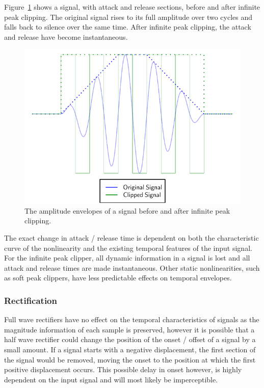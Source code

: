 			Figure~\ref{fig:InfinitePeakClipping} shows a signal, with attack and release sections, before and
			after infinite peak clipping. The original signal rises to its full amplitude over two cycles and
			falls back to silence over the same time. After infinite peak clipping, the attack and release have
			become instantaneous.

			\begin{figure}[h!]
				\centering
				\includegraphics{chapter5/Images/InfinitePeakClipping.pdf}
				\caption{The amplitude envelopes of a signal before and after infinite peak clipping.}
				\label{fig:InfinitePeakClipping}
			\end{figure}

			The exact change in attack / release time is dependent on both the characteristic curve of the
			nonlinearity and the existing temporal features of the input signal. For the infinite peak clipper,
			all dynamic information in a signal is lost and all attack and release times are made
			instantaneous. Other static nonlinearities, such as soft peak clippers, have less predictable
			effects on temporal envelopes. 

		\subsubsection*{Rectification}
			Full wave rectifiers have no effect on the temporal characteristics of signals as the magnitude
			information of each sample is preserved, however it is possible that a half wave rectifier could
			change the position of the onset / offset of a signal by a small amount. If a signal starts with a
			negative displacement, the first section of the signal would be removed, moving the onset to the
			position at which the first positive displacement occurs. This possible delay in onset however, is
			highly dependent on the input signal and will most likely be imperceptible.
			
